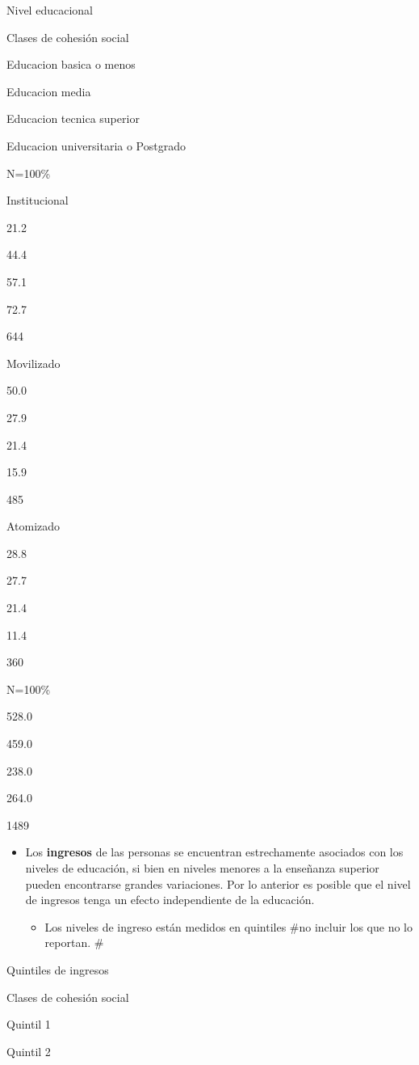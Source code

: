 \documentclass[
  12pt,
]{book}
\providecommand{\tightlist}{%
  \setlength{\itemsep}{0pt}\setlength{\parskip}{0pt}}
\begin{document}
Nivel educacional

Clases de cohesión social

Educacion basica o menos

Educacion media

Educacion tecnica superior

Educacion universitaria o Postgrado

N=100\%

Institucional

21.2

44.4

57.1

72.7

644

Movilizado

50.0

27.9

21.4

15.9

485

Atomizado

28.8

27.7

21.4

11.4

360

N=100\%

528.0

459.0

238.0

264.0

1489

\begin{itemize}
\tightlist
\item
  Los \textbf{ingresos} de las personas se encuentran estrechamente asociados con los niveles de educación, si bien en niveles menores a la enseñanza superior pueden encontrarse grandes variaciones. Por lo anterior es posible que el nivel de ingresos tenga un efecto independiente de la educación.

  \begin{itemize}
  \tightlist
  \item
    Los niveles de ingreso están medidos en quintiles \#no incluir los que no lo reportan. \#
  \end{itemize}
\end{itemize}

Quintiles de ingresos

Clases de cohesión social

Quintil 1

Quintil 2
\end{document}
